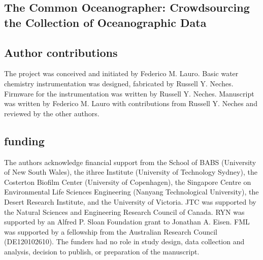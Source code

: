 \begin{refsection}

\chapter{The Common Oceanographer: Crowdsourcing the Collection of Oceanographic Data}


\section{Author contributions}

The project was conceived and initiated by Federico M. Lauro. Basic
water chemistry instrumentation was designed, fabricated by Russell Y.
Neches. Firmware for the instrumentation was written by Russell Y.
Neches. Manuscript was written by Federico M. Lauro with contributions
from Russell Y. Neches and reviewed by the other authors.










\section{funding}

The authors acknowledge financial support from the School of BABS (University of New South Wales), the ithree Institute (University of Technology Sydney), the Costerton Biofilm Center (University of Copenhagen), the Singapore Centre on Environmental Life Sciences Engineering (Nanyang Technological University), the Desert Research Institute, and the University of Victoria. JTC was supported by the Natural Sciences and Engineering Research Council of Canada. RYN was supported by an Alfred P. Sloan Foundation grant to Jonathan A. Eisen. FML was supported by a fellowship from the Australian Research Council (DE120102610). The funders had no role in study design, data collection and analysis, decision to publish, or preparation of the manuscript.


\end{refsection}
